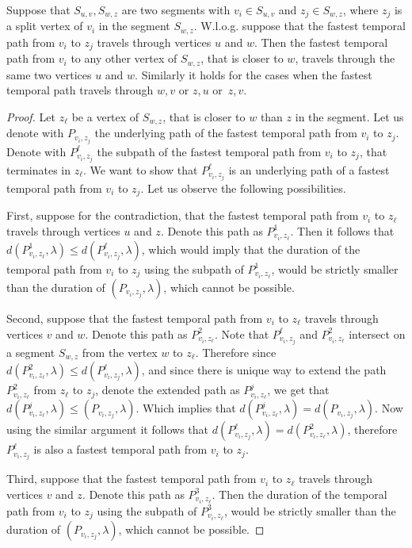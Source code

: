 \documentclass[a4paper,UKenglish,cleveref, autoref, thm-restate]{lipics-v2021}
\begin{document}
\begin{lemma}\label{lemma:FPT-unlabeldPaths-01}
    Suppose that
    $S_{u,v}, S_{w,z}$ are two segments with $ v_i \in S_{u,v}$ and $z_j \in S_{w,z}$,
    where $z_j$ is a split vertex of $v_i$ in the segment $S_{w,z}$.
    W.l.o.g. suppose that the fastest temporal path from $v_i$ to $z_j$ travels through vertices $u$ and $w$.
    Then the fastest temporal path from $v_i$ to any other vertex of $S_{w,z}$, that is closer to $w$,
    travels through the same two vertices $u$ and $w$.
    Similarly it holds for the cases when the fastest temporal path travels through $w,v$ or $z,u$ or~$z,v$.
\end{lemma}
\begin{proof}
    Let $z_\ell$ be a vertex of $S_{w,z}$, that is closer to $w$ than $z$ in the segment.
    Let us denote with $P_{v_i,z_j}$ the underlying path of the fastest temporal path from $v_i$ to $z_j$.
    Denote with $P_{v_i,z_j}^\ell$
    the subpath of the fastest temporal path from $v_i$ to $z_j$, that terminates in $z_\ell$.
    We want to show that $P_{v_i,z_j}^\ell$ is an underlying path of a fastest temporal path from $v_i$ to $z_j$.
    Let us observe the following possibilities.
 
    First, suppose for the contradiction, that the fastest temporal path from $v_i$ to $z_\ell$ travels through vertices $u$ and $z$.
    Denote this path as $P^1_{v_i,z_\ell}$.
    Then it follows that $d(P^1_{v_i,z_\ell}, \lambda) \leq d(P_{v_i,z_j}^\ell,\lambda)$, which would imply that
    the duration of the temporal path from $v_i$ to $z_j$ using the subpath of $P^1_{v_i,z_\ell}$, would be strictly smaller than the duration of $(P_{v_i,z_j},\lambda)$, which cannot be possible.
 
    Second, suppose that the fastest temporal path from $v_i$ to $z_\ell$ travels through vertices $v$ and $w$.
    Denote this path as $P^2_{v_i,z_\ell}$.
    Note that $P_{v_i,z_j}^\ell$ and $P^2_{v_i,z_\ell}$ intersect on a segment $S_{w,z}$ from the vertex $w$ to $z_\ell$.
    Therefore since
    $d(P^2_{v_i,z_\ell}, \lambda) \leq d(P_{v_i,z_j}^\ell,\lambda)$,
    and since there is unique way to
    extend the path $P^2_{v_i,z_\ell}$ from $z_\ell$ to $z_j$, denote the extended path as $P^j_{v_i,z_\ell}$,
    we get that $d(P^j_{v_i,z_\ell}, \lambda) \leq $$(P_{v_i,z_j},\lambda)$.
    Which implies that $d(P^j_{v_i,z_\ell}, \lambda) = d(P_{v_i,z_j}, \lambda)$.
    Now using the similar argument it follows that $d(P_{v_i,z_j}^\ell, \lambda) = d(P^2_{v_i,z_\ell}, \lambda)$,
    therefore $P_{v_i,z_j}^\ell$ is also a fastest temporal path from $v_i$ to $z_j$.
 
    Third, suppose that the fastest temporal path from $v_i$ to $z_\ell$ travels through vertices $v$ and $z$.
    Denote this path as $P^3_{v_i,z_\ell}$.
    Then the duration of the temporal path from $v_i$ to $z_j$ using the subpath of $P^3_{v_i,z_\ell}$, would be strictly smaller than the duration of $(P_{v_i,z_j},\lambda)$, which cannot be possible.
\end{proof}
\end{document}
